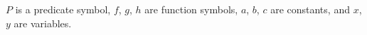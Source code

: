 $P$ is a predicate symbol, $f$, $g$, $h$ are function symbols, $a$, $b$, $c$ are constants, and $x$, $y$ are variables.

